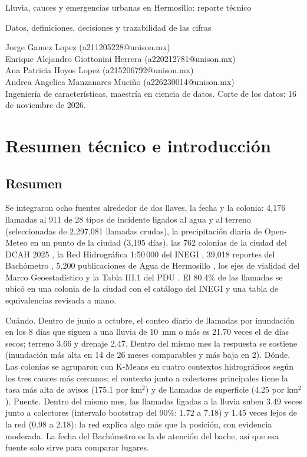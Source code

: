 \documentclass[11pt]{article}
\begin{document}
\begin{center}
  {\LARGE Lluvia, cauces y emergencias urbanas en Hermosillo: reporte técnico\par}
  \vspace{0.3em}
  {\large Datos, definiciones, decisiones y trazabilidad de las cifras\par}
  \vspace{0.8em}
  Jorge Gamez Lopez (a211205228@unison.mx)\\
  Enrique Alejandro Giottonini Herrera (a220212781@unison.mx)\\
  Ana Patricia Hoyos Lopez (a215206792@unison.mx)\\
  Andrea Angelica Manzanares Muciño (a226230014@unison.mx)\\[0.5em]
  Ingeniería de características, maestría en ciencia de datos. Corte de los datos: 16 de noviembre de 2026.
\end{center}

\section{Resumen técnico e introducción}
\label{sec:intro}

\subsection{Resumen}

Se integraron ocho fuentes alrededor de dos llaves, la fecha y la colonia: 4,176 llamadas al 911 \cite{marcelinux2025} de 28 tipos de incidente ligados al agua y al terreno (seleccionadas de 2,297,081 llamadas crudas), la precipitación diaria de Open-Meteo \cite{zippenfenig2023} en un punto de la ciudad (3,195 días), las 762 colonias de la ciudad del DCAH 2025 \cite{inegidcah}, la Red Hidrográfica 1:50\,000 del INEGI \cite{inegired}, 39,018 reportes del Bachómetro \cite{bachometro}, 5,200 publicaciones de Agua de Hermosillo \cite{aguah}, los ejes de vialidad del Marco Geoestadístico \cite{inegimg} y la Tabla III.1 del PDU \cite{implanpdu}. El 80.4\% de las llamadas se ubicó en una colonia de la ciudad con el catálogo del INEGI y una tabla de equivalencias revisada a mano.

Cuándo. Dentro de junio a octubre, el conteo diario de llamadas por inundación en los 8 días que siguen a una lluvia de 10~mm o más es 21.70 veces el de días secos; terreno 3.66 y drenaje 2.47. Dentro del mismo mes la respuesta se sostiene (inundación más alta en 14 de 26 meses comparables y más baja en 2). Dónde. Las colonias se agruparon con K-Means en cuatro contextos hidrográficos según los tres cauces más cercanos; el contexto junto a colectores principales tiene la tasa más alta de avisos (175.1 por km$^2$) y de llamadas de superficie (4.25 por km$^2$). Puente. Dentro del mismo mes, las llamadas ligadas a la lluvia suben 3.49 veces junto a colectores (intervalo bootstrap del 90\%: 1.72 a 7.18) y 1.45 veces lejos de la red (0.98 a 2.18): la red explica algo más que la posición, con evidencia moderada. La fecha del Bachómetro es la de atención del bache, así que esa fuente solo sirve para comparar lugares.
\end{document}
